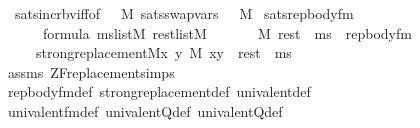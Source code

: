 \begin{isabellebody}
{}\isanewline
\ \ sats{\isacharunderscore}{\kern0pt}incr{\isacharunderscore}{\kern0pt}bv{}{\isacharunderscore}{\kern0pt}iff{\isacharbrackleft}{\kern0pt}of\ {\isacharunderscore}{\kern0pt}\ {\isacharunderscore}{\kern0pt}\ M{\isacharbrackright}{\kern0pt}\ sats{\isacharunderscore}{\kern0pt}swap{\isacharunderscore}{\kern0pt}vars\ \ {\isasymphi}\ M\isanewline
\isanewline
{}\isamarkupfalse%
\ sats{\isacharunderscore}{\kern0pt}rep{\isacharunderscore}{\kern0pt}body{\isacharunderscore}{\kern0pt}fm{\isacharcolon}{\kern0pt}\isanewline
\ \ \isanewline
\ \ \ \ {\isachardoublequoteopen}{\isasymphi}\ {\isasymin}\ formula{\isachardoublequoteclose}\ {\isachardoublequoteopen}ms{\isasymin}list{\isacharparenleft}{\kern0pt}M{\isacharparenright}{\kern0pt}{\isachardoublequoteclose}\ {\isachardoublequoteopen}rest{\isasymin}list{\isacharparenleft}{\kern0pt}M{\isacharparenright}{\kern0pt}{\isachardoublequoteclose}\isanewline
\ \ \isanewline
\ \ \ \ {\isachardoublequoteopen}M{\isacharcomma}{\kern0pt}\ rest\ {\isacharat}{\kern0pt}\ ms\ {\isasymTurnstile}\ rep{\isacharunderscore}{\kern0pt}body{\isacharunderscore}{\kern0pt}fm{\isacharparenleft}{\kern0pt}{\isasymphi}{\isacharparenright}{\kern0pt}\ {\isasymlongleftrightarrow}\ \isanewline
\ \ \ \ \ strong{\isacharunderscore}{\kern0pt}replacement{\isacharparenleft}{\kern0pt}{\isacharhash}{\kern0pt}{\isacharhash}{\kern0pt}M{\isacharcomma}{\kern0pt}{\isasymlambda}x\ y{\isachardot}{\kern0pt}\ M{\isacharcomma}{\kern0pt}\ {\isacharbrackleft}{\kern0pt}x{\isacharcomma}{\kern0pt}y{\isacharbrackright}{\kern0pt}\ {\isacharat}{\kern0pt}\ rest\ {\isacharat}{\kern0pt}\ ms\ {\isasymTurnstile}\ {\isasymphi}{\isacharparenright}{\kern0pt}{\isachardoublequoteclose}\isanewline
%
\isadelimproof
\ \ %
\endisadelimproof
%
\isatagproof
{}\isamarkupfalse%
\ assms\ ZF{\isacharunderscore}{\kern0pt}replacement{\isacharunderscore}{\kern0pt}simps\ \isanewline
\ \ \isamarkupfalse%
\ rep{\isacharunderscore}{\kern0pt}body{\isacharunderscore}{\kern0pt}fm{\isacharunderscore}{\kern0pt}def\ strong{\isacharunderscore}{\kern0pt}replacement{\isacharunderscore}{\kern0pt}def\ univalent{\isacharunderscore}{\kern0pt}def\isanewline
\ \ \isamarkupfalse%
\ univalent{\isacharunderscore}{\kern0pt}fm{\isacharunderscore}{\kern0pt}def\ univalent{\isacharunderscore}{\kern0pt}Q{}{\isacharunderscore}{\kern0pt}def\ univalent{\isacharunderscore}{\kern0pt}Q{}{\isacharunderscore}{\kern0pt}def\isanewline
\ \ \isamarkupfalse%

\end{isabellebody}
